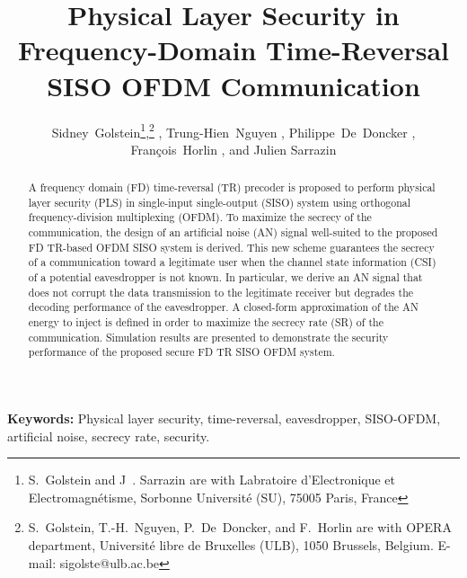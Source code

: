 \documentclass[a4paper,11pt]{article}
\title{Physical Layer Security in Frequency-Domain Time-Reversal SISO OFDM Communication}
\author{Sidney~Golstein\thanks{S.~Golstein and J~. Sarrazin are with Labratoire d'Electronique et Electromagn\'etisme, Sorbonne Universit\'e (SU), 75005 Paris, France},\thanks{S.~Golstein, T.-H.~Nguyen, P.~De~Doncker, and F.~Horlin are with OPERA department, Universit\'e libre de Bruxelles (ULB), 1050 Brussels, Belgium. E-mail: sigolste@ulb.ac.be} , Trung-Hien~Nguyen \footnotemark[2] , Philippe~De~Doncker \footnotemark[2],\\ Fran\c cois~Horlin \footnotemark[2] , and Julien Sarrazin\footnotemark[1]  }
\begin{document}
\maketitle





\begin{abstract}
A frequency domain (FD) time-reversal (TR) precoder is proposed to perform physical layer security (PLS) in single-input single-output (SISO) system using orthogonal frequency-division multiplexing (OFDM). To maximize the secrecy of the communication, the design of an artificial noise (AN) signal well-suited to the proposed FD TR-based OFDM SISO system is derived. This new scheme guarantees the secrecy of a communication toward a legitimate user when the channel state information (CSI) of a potential eavesdropper is not known. In particular, we derive an AN signal that does not corrupt the data transmission to the legitimate receiver but degrades the decoding performance of the eavesdropper. A closed-form approximation of the AN energy to inject is defined in order to maximize the secrecy rate (SR) of the communication. Simulation results are presented to demonstrate the security performance of the proposed secure FD TR SISO OFDM system.\end{abstract}

\textbf{Keywords:} {Physical layer security, time-reversal, eavesdropper, SISO-OFDM, artificial noise, secrecy rate, security. }
\end{document}
